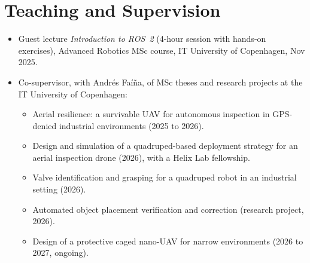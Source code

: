 \documentclass[a4paper,11pt]{article}
\begin{document}
\section{Teaching and Supervision}
\begin{itemize}
    \item Guest lecture \textit{Introduction to ROS~2} (4-hour session with hands-on exercises), Advanced Robotics MSc course, IT University of Copenhagen, Nov 2025.
    \item Co-supervisor, with Andrés Faíña, of MSc theses and research projects at the IT University of Copenhagen:
    \begin{itemize}
        \item Aerial resilience: a survivable UAV for autonomous inspection in GPS-denied industrial environments (2025 to 2026).
        \item Design and simulation of a quadruped-based deployment strategy for an aerial inspection drone (2026), with a Helix Lab fellowship.
        \item Valve identification and grasping for a quadruped robot in an industrial setting (2026).
        \item Automated object placement verification and correction (research project, 2026).
        \item Design of a protective caged nano-UAV for narrow environments (2026 to 2027, ongoing).
    \end{itemize}
\end{itemize}

\end{document}
